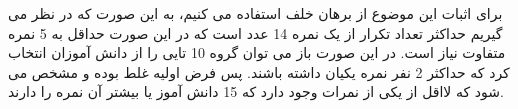 	\p
 برای اثبات این موضوع از برهان خلف استفاده می کنیم، به این صورت که در نظر می گیریم حداکثر تعداد تکرار از یک نمره 14 عدد است که در این صورت حداقل به 5 نمره متفاوت نیاز است. در این صورت باز می توان گروه 10 تایی را از دانش آموزان انتخاب کرد که حداکثر 2 نفر نمره یکیان داشته باشند. پس فرض اولیه غلط بوده و مشخص می شود که لااقل از یکی از نمرات وجود دارد که 15 دانش آموز یا بیشتر آن نمره را دارند. 